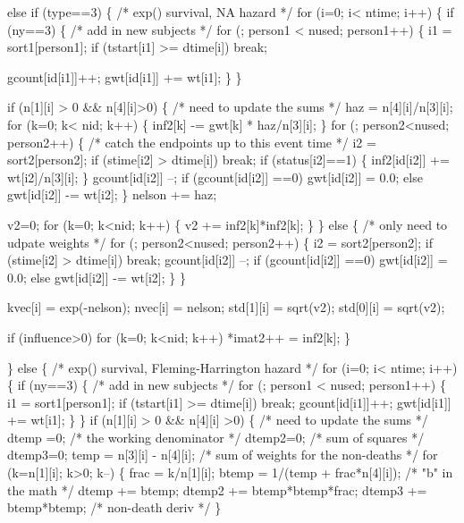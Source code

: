 \documentclass{article}
\begin{document}
\begin{nwchunk}
 else if (type==3) \{  /* exp() survival, NA hazard */
     for (i=0; i< ntime; i++) \{
         if (ny==3) \{
             /* add in new subjects */
             for (; person1 < nused; person1++) \{
                 i1 = sort1[person1];
                 if (tstart[i1] >= dtime[i]) break;
 
                 gcount[id[i1]]++;
                 gwt[id[i1]] += wt[i1];
             \}
         \}
          
         if (n[1][i] > 0 && n[4][i]>0) \{ /* need to update the sums */
             haz = n[4][i]/n[3][i];
             for (k=0; k< nid; k++) \{
                 inf2[k] -= gwt[k] * haz/n[3][i];
             \}
             for (; person2<nused; person2++) \{ 
                 /* catch the endpoints up to this event time */
                 i2 = sort2[person2];
                 if (stime[i2] > dtime[i]) break;
                 if (status[i2]==1) \{
                      inf2[id[i2]] += wt[i2]/n[3][i];
                 \}
                 gcount[id[i2]] --;
                 if (gcount[id[i2]] ==0) gwt[id[i2]] = 0.0;
                 else gwt[id[i2]] -= wt[i2];
             \}
             nelson += haz;
            
             v2=0;
             for (k=0; k<nid; k++) \{
                 v2 += inf2[k]*inf2[k];
             \}
         \} else \{  /* only need to udpate weights */
             for (; person2<nused; person2++) \{ 
                 i2 = sort2[person2];
                 if (stime[i2] > dtime[i]) break;
                 gcount[id[i2]] --;
                 if (gcount[id[i2]] ==0) gwt[id[i2]] = 0.0;
                 else gwt[id[i2]] -= wt[i2];
             \}
         \}
  
         kvec[i] = exp(-nelson);
         nvec[i] = nelson;
         std[1][i] = sqrt(v2);
         std[0][i] = sqrt(v2);
         
         if (influence>0)
             for (k=0; k<nid; k++) *imat2++ = inf2[k];
     \}
 
 \} else \{  /* exp() survival,  Fleming-Harrington hazard */
     for (i=0; i< ntime; i++) \{
         if (ny==3) \{
             /* add in new subjects */
             for (; person1 < nused; person1++) \{
                 i1 = sort1[person1];
                 if (tstart[i1] >= dtime[i]) break;
                 gcount[id[i1]]++;
                 gwt[id[i1]] += wt[i1];
             \}
         \}
         if (n[1][i] > 0 && n[4][i] >0) \{ /* need to update the sums */
                 dtemp =0;  /* the working denominator */
             dtemp2=0;  /* sum of squares */
             dtemp3=0;
             temp = n[3][i] - n[4][i];  /* sum of weights for the non-deaths */
             for (k=n[1][i]; k>0; k--) \{
                 frac = k/n[1][i];  
                 btemp = 1/(temp + frac*n[4][i]);  /* "b" in the math */
                 dtemp += btemp;
                 dtemp2 += btemp*btemp*frac;
                 dtemp3 += btemp*btemp;    /* non-death deriv */
             \} 
             

\end{nwchunk}
\end{document}

